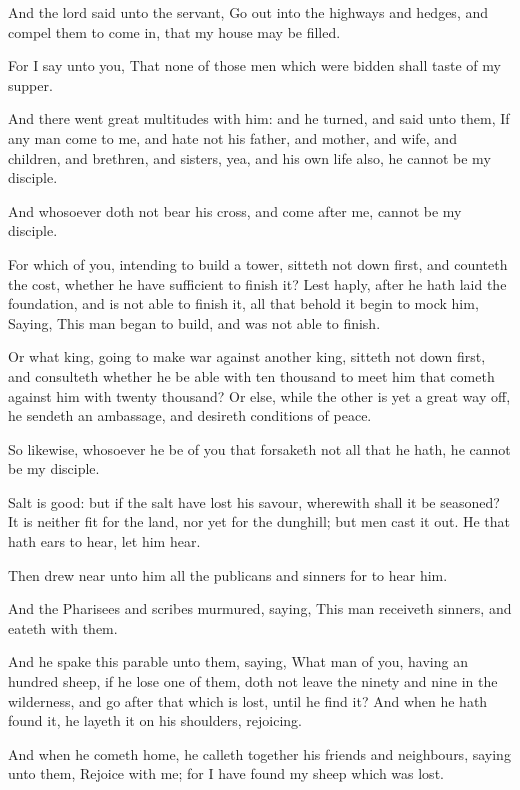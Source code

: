 \Verse And the lord said unto the servant, Go out into the highways and hedges, and compel them to come in, that my house may be filled.

\Verse For I say unto you, That none of those men which were bidden shall taste of my supper.

\Verse And there went great multitudes with him: and he turned, and said unto them, \Verse If any man come to me, and hate not his father, and mother, and wife, and children, and brethren, and sisters, yea, and his own life also, he cannot be my disciple.

\Verse And whosoever doth not bear his cross, and come after me, cannot be my disciple.

\Verse For which of you, intending to build a tower, sitteth not down first, and counteth the cost, whether he have sufficient to finish it?  \Verse Lest haply, after he hath laid the foundation, and is not able to finish it, all that behold it begin to mock him, \Verse Saying, This man began to build, and was not able to finish.

\Verse Or what king, going to make war against another king, sitteth not down first, and consulteth whether he be able with ten thousand to meet him that cometh against him with twenty thousand?  \Verse Or else, while the other is yet a great way off, he sendeth an ambassage, and desireth conditions of peace.

\Verse So likewise, whosoever he be of you that forsaketh not all that he hath, he cannot be my disciple.

\Verse Salt is good: but if the salt have lost his savour, wherewith shall it be seasoned?  \Verse It is neither fit for the land, nor yet for the dunghill; but men cast it out. He that hath ears to hear, let him hear.


\Chapter
\Verse Then drew near unto him all the publicans and sinners for to hear him.

\Verse And the Pharisees and scribes murmured, saying, This man receiveth sinners, and eateth with them.

\Verse And he spake this parable unto them, saying, \Verse What man of you, having an hundred sheep, if he lose one of them, doth not leave the ninety and nine in the wilderness, and go after that which is lost, until he find it?  \Verse And when he hath found it, he layeth it on his shoulders, rejoicing.

\Verse And when he cometh home, he calleth together his friends and neighbours, saying unto them, Rejoice with me; for I have found my sheep which was lost.

